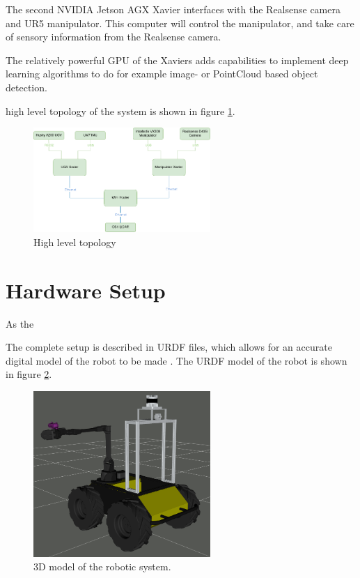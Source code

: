 The second NVIDIA Jetson AGX Xavier interfaces with the Realsense camera and UR5 manipulator. This computer will control the manipulator, and take care of sensory information from the Realsense camera. 

The relatively powerful GPU of the Xaviers adds capabilities to implement deep learning algorithms to do for example image- or PointCloud based object detection.



 high level topology of the system is shown in figure \ref{fig:topology}.

\begin{figure}[H]
  \centering
  \includegraphics[width = 0.6\textwidth]{Figures/example_figure.drawio.png}
  \caption{High level topology}
  \label{fig:topology}
\end{figure}




  
\section{Hardware Setup}
As the

The complete setup is described in URDF files, which allows for an accurate digital model of the robot to be made . The URDF model of the robot is shown in figure \ref{fig:hardware}.

\begin{figure}[H]
  \centering
  \includegraphics[width = 0.6\textwidth]{Figures/husky_initiated.png}
  \caption{3D model of the robotic system.}
  \label{fig:hardware}
\end{figure}


